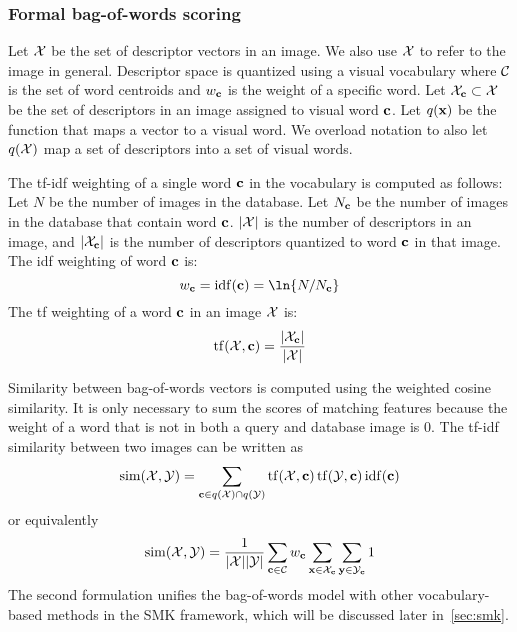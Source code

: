         \subsubsection{Formal bag-of-words scoring}
            Let $\mathcal{X}$ be the set of descriptor vectors in an image. We also use $\mathcal{X}$ to refer to the image in
            general. Descriptor space is quantized using a visual vocabulary where $\mathcal{C}$ is the set of word
            centroids and $w_{\mathbf{c}}$ is the weight of a specific word. Let $\mathcal{X}_{\mathbf{c}} \subset \mathcal{X}$ be the set of descriptors
            in an image assigned to visual word $\mathbf{c}$. Let $q(\mathbf{x})$ be the function that maps a vector to a visual
            word. We overload notation to also let $q(\mathcal{X})$ map a set of descriptors into a set of visual words.

            The tf-idf weighting of a single word $\mathbf{c}$ in the vocabulary is computed as follows: Let $N$ be the
            number of images in the database. Let $N_{\mathbf{c}}$ be the number of images in the database that contain word
            $\mathbf{c}$. $|\mathcal{X}|$ is the number of descriptors in an image, and $|\mathcal{X}_{\mathbf{c}}|$ is the number of
            descriptors quantized to word $\mathbf{c}$ in that image. The idf weighting of word $\mathbf{c}$ is:
            \begin{equation}
                w_\c = \opname{idf}(\c) = \ln{N/N_\c}
            \end{equation}
            The tf weighting of a word $\mathbf{c}$ in an image $\mathcal{X}$ is:
            \begin{equation}
                \operatorname{tf}(\mathcal{X}, \mathbf{c}) = \frac{|\mathcal{X}_{\mathbf{c}}|}{|\mathcal{X}|}
            \end{equation}

            Similarity between bag-of-words vectors is computed using the weighted cosine similarity. It is only
            necessary to sum the scores of matching features because the weight of a word that is not in both a
            query and database image is $0$. The tf-idf similarity between two images can be written as
            \begin{equation}
                \operatorname{sim}(\mathcal{X}, \mathcal{Y}) = \sum_{\mathbf{c} \in q(\mathcal{X}) \cap q(\mathcal{Y})} \operatorname{tf}(\mathcal{X}, \mathbf{c}) \operatorname{tf}(\mathcal{Y}, \mathbf{c}) \operatorname{idf}(\mathbf{c}) 
            \end{equation}
            or equivalently
            \begin{equation}
                \operatorname{sim}(\mathcal{X}, \mathcal{Y}) = \frac{1}{|\mathcal{X}||\mathcal{Y}|}\sum_{\mathbf{c} \in \mathcal{C}} w_{\mathbf{c}} \sum_{\mathbf{x} \in \mathcal{X}_{\mathbf{c}}} \sum_{\mathbf{y} \in \mathcal{Y}_{\mathbf{c}}} 1
            \end{equation}
            The second formulation unifies the bag-of-words model with other vocabulary-based methods in the SMK
            framework, which will be discussed later in~\cref{sec:smk}.


